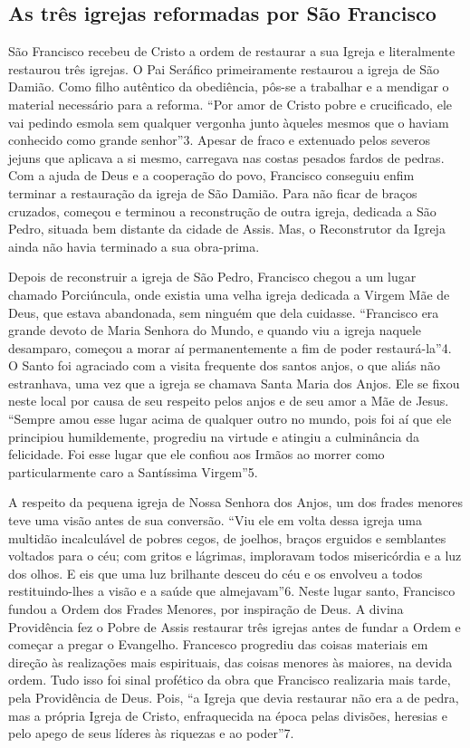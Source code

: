 \documentclass[a4paper,12pt]{extarticle} \usepackage[utf8]{inputenc}
\begin{document}
\subsection{As três igrejas reformadas por São Francisco}

São Francisco recebeu de Cristo a ordem de restaurar a sua Igreja e literalmente restaurou três igrejas. O Pai Seráfico primeiramente restaurou a igreja de São Damião. Como filho autêntico da obediência, pôs-se a trabalhar e a mendigar o material necessário para a reforma. “Por amor de Cristo pobre e crucificado, ele vai pedindo esmola sem qualquer vergonha junto àqueles mesmos que o haviam conhecido como grande senhor”3. Apesar de fraco e extenuado pelos severos jejuns que aplicava a si mesmo, carregava nas costas pesados fardos de pedras. Com a ajuda de Deus e a cooperação do povo, Francisco conseguiu enfim terminar a restauração da igreja de São Damião. Para não ficar de braços cruzados, começou e terminou a reconstrução de outra igreja, dedicada a São Pedro, situada bem distante da cidade de Assis. Mas, o Reconstrutor da Igreja ainda não havia terminado a sua obra-prima.

Depois de reconstruir a igreja de São Pedro, Francisco chegou a um lugar chamado Porciúncula, onde existia uma velha igreja dedicada a Virgem Mãe de Deus, que estava abandonada, sem ninguém que dela cuidasse. “Francisco era grande devoto de Maria Senhora do Mundo, e quando viu a igreja naquele desamparo, começou a morar aí permanentemente a fim de poder restaurá-la”4. O Santo foi agraciado com a visita frequente dos santos anjos, o que aliás não estranhava, uma vez que a igreja se chamava Santa Maria dos Anjos. Ele se fixou neste local por causa de seu respeito pelos anjos e de seu amor a Mãe de Jesus. “Sempre amou esse lugar acima de qualquer outro no mundo, pois foi aí que ele principiou humildemente, progrediu na virtude e atingiu a culminância da felicidade. Foi esse lugar que ele confiou aos Irmãos ao morrer como particularmente caro a Santíssima Virgem”5.

A respeito da pequena igreja de Nossa Senhora dos Anjos, um dos frades menores teve uma visão antes de sua conversão. “Viu ele em volta dessa igreja uma multidão incalculável de pobres cegos, de joelhos, braços erguidos e semblantes voltados para o céu; com gritos e lágrimas, imploravam todos misericórdia e a luz dos olhos. E eis que uma luz brilhante desceu do céu e os envolveu a todos restituindo-lhes a visão e a saúde que almejavam”6. Neste lugar santo, Francisco fundou a Ordem dos Frades Menores, por inspiração de Deus. A divina Providência fez o Pobre de Assis restaurar três igrejas antes de fundar a Ordem e começar a pregar o Evangelho. Francesco progrediu das coisas materiais em direção às realizações mais espirituais, das coisas menores às maiores, na devida ordem. Tudo isso foi sinal profético da obra que Francisco realizaria mais tarde, pela Providência de Deus. Pois, “a Igreja que devia restaurar não era a de pedra, mas a própria Igreja de Cristo, enfraquecida na época pelas divisões, heresias e pelo apego de seus líderes às riquezas e ao poder”7.
\end{document}
